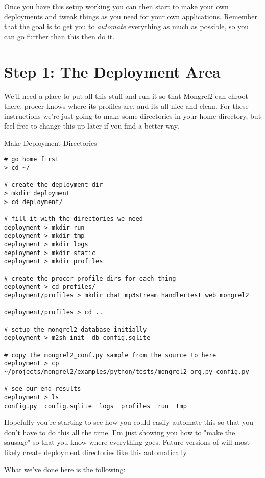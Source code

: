 Once you have this setup working you can then start to make your own
deployments and tweak things as you need for your own applications.  Remember
that the goal is to get you to \emph{automate} everything as much as possible,
so you can go further than this then do it.

\section{Step 1: The Deployment Area}

We'll need a place to put all this stuff and run it so that Mongrel2 can chroot
there, procer knows where its profiles are, and its all nice and clean.  For these
instructions we're just going to make some directories in your home directory,
but feel free to change this up later if you find a better way.

\begin{code}{Make Deployment Directories}
\begin{Verbatim}
# go home first
> cd ~/

# create the deployment dir
> mkdir deployment
> cd deployment/

# fill it with the directories we need
deployment > mkdir run
deployment > mkdir tmp
deployment > mkdir logs
deployment > mkdir static
deployment > mkdir profiles

# create the procer profile dirs for each thing
deployment > cd profiles/
deployment/profiles > mkdir chat mp3stream handlertest web mongrel2

deployment/profiles > cd ..

# setup the mongrel2 database initially
deployment > m2sh init -db config.sqlite

# copy the mongrel2_conf.py sample from the source to here
deployment > cp ~/projects/mongrel2/examples/python/tests/mongrel2_org.py config.py

# see our end results
deployment > ls
config.py  config.sqlite  logs	profiles  run  tmp

\end{Verbatim}
\end{code}

Hopefully you're starting to see how you could easily automate this so that you don't
have to do this all the time.  I'm just showing you how to "make the sausage" so that
you know where everything goes.  Future versions of  will most likely 
create deployment directories like this automatically.

What we've done here is the following:

